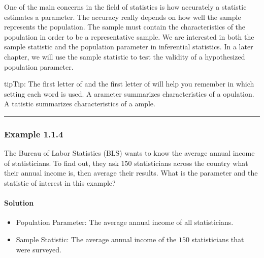 \documentclass[letterpaper,10pt,english]{jupyterBook}
\begin{document}
\sphinxAtStartPar
One of the main concerns in the field of statistics is how accurately a statistic estimates a parameter. The accuracy really depends on how well the sample represents the population. The sample must contain the characteristics of the population in order to be a representative sample. We are interested in both the sample statistic and the population parameter in inferential statistics. In a later chapter, we will use the sample statistic to test the validity of a hypothesized population parameter.

\begin{sphinxadmonition}{tip}{Tip:}
\sphinxAtStartPar
The first letter of  and the first letter of  will help you remember in which setting each word is used. A arameter summarizes characteristics of a opulation. A tatistic summarizes characteristics of a ample.
\end{sphinxadmonition}


\bigskip\hrule\bigskip



\subsubsection{Example 1.1.4}
\label{\detokenize{Ch1 Sampling and Data/1.1 Key Terms in Statistics:example-1-1-4}}
\sphinxAtStartPar
The Bureau of Labor Statistics (BLS) wants to know the average annual income of statisticians. To find out, they ask \(150\) statisticians across the country what their annual income is, then average their results. What is the parameter and the statistic of interest in this example?


\paragraph{Solution}
\label{\detokenize{Ch1 Sampling and Data/1.1 Key Terms in Statistics:id2}}\begin{itemize}
\item {} 
\sphinxAtStartPar
Population Parameter: The average annual income of all statisticians.

\item {} 
\sphinxAtStartPar
Sample Statistic: The average annual income of the \(150\) statisticians that were surveyed.

\end{itemize}
\end{document}
